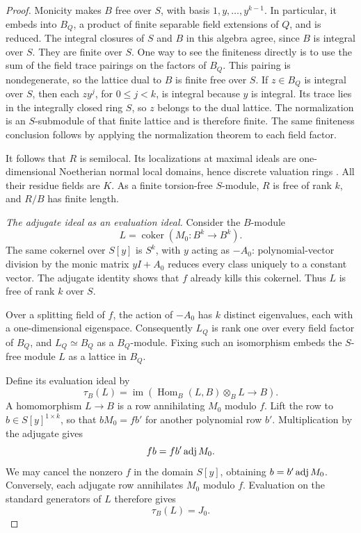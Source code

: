 \begin{proof}
Monicity makes \(B\) free over \(S\), with basis
\(1,y,\ldots,y^{k-1}\).  In particular, it embeds into \(B_Q\), a product
of finite separable field extensions of \(Q\), and is reduced.  The integral closures of
\(S\) and \(B\) in this algebra agree, since \(B\) is integral over \(S\).
They are finite over \(S\).  One way to see the finiteness directly is to
use the sum of the field trace pairings on the factors of \(B_Q\).
This pairing is nondegenerate, so the lattice dual to \(B\) is finite
free over \(S\).  If \(z\in B_Q\) is integral over \(S\), then each
\(zy^j\), for \(0\le j<k\), is integral because \(y\) is integral.
Its trace lies in the integrally closed ring \(S\), so \(z\) belongs
to the dual lattice.
The normalization is an \(S\)-submodule of that finite lattice and is
therefore finite.  The same finiteness conclusion follows by applying
the normalization theorem \cite[Tag 032L]{StacksProject} to each field
factor.

It follows that \(R\) is semilocal.  Its localizations at maximal ideals
are one-dimensional Noetherian normal local domains, hence discrete
valuation rings \cite[Tag 00PD]{StacksProject}.  All their residue fields
are \(K\).  As a finite torsion-free \(S\)-module, \(R\) is free of
rank \(k\), and \(R/B\) has finite length.

\medskip
\noindent
\emph{The adjugate ideal as an evaluation ideal.}
Consider the \(B\)-module
\[
 L=\operatorname{coker}(M_0:B^k\longrightarrow B^k).
\]
The same cokernel over \(S[y]\) is \(S^k\), with \(y\) acting as
\(-A_0\): polynomial-vector division by the monic matrix \(yI+A_0\)
reduces every class uniquely to a constant vector.  The adjugate identity
shows that \(f\) already kills this cokernel.  Thus \(L\) is free of
rank \(k\) over \(S\).

Over a splitting field of \(f\), the action of \(-A_0\) has \(k\)
distinct eigenvalues, each with a one-dimensional eigenspace.
Consequently \(L_Q\) is rank one over every field factor of \(B_Q\),
and \(L_Q\simeq B_Q\) as a \(B_Q\)-module.  Fixing such an isomorphism
embeds the \(S\)-free module \(L\) as a lattice in \(B_Q\).

Define its evaluation ideal by
\[
 \tau_B(L)=
 \operatorname{im}\left(
 \operatorname{Hom}_B(L,B)\otimes_B L\longrightarrow B
 \right).
\]
A homomorphism \(L\to B\) is a row annihilating \(M_0\) modulo \(f\).
Lift the row to \(b\in S[y]^{1\times k}\), so that
\(bM_0=fb'\) for another polynomial row \(b'\).
Multiplication by the adjugate gives
\[
 fb=fb'\operatorname{adj} M_0.
\]
We may cancel the nonzero \(f\) in the domain \(S[y]\), obtaining
\(b=b'\operatorname{adj} M_0\).  Conversely, each adjugate row annihilates \(M_0\)
modulo \(f\).  Evaluation on the standard generators of \(L\) therefore
gives
\begin{equation}
 \tau_B(L)=J_0.
 \label{eq:conductor-evaluation}
\end{equation}


\end{proof}
